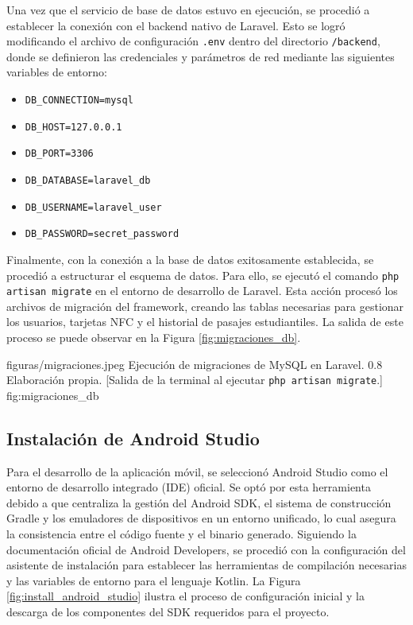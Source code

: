 \documentclass[12pt,letterpaper]{report}
\begin{document}
	Una vez que el servicio de base de datos estuvo en ejecución, se procedió a establecer la conexión con el backend nativo de Laravel. Esto se logró modificando el archivo de configuración \texttt{.env} dentro del directorio \texttt{/backend}, donde se definieron las credenciales y parámetros de red mediante las siguientes variables de entorno:
	
	\begin{itemize}
		\item \texttt{DB\_CONNECTION=mysql}
		\item \texttt{DB\_HOST=127.0.0.1}
		\item \texttt{DB\_PORT=3306}
		\item \texttt{DB\_DATABASE=laravel\_db}
		\item \texttt{DB\_USERNAME=laravel\_user}
		\item \texttt{DB\_PASSWORD=secret\_password}
	\end{itemize}
	
	Finalmente, con la conexión a la base de datos exitosamente establecida, se procedió a estructurar el esquema de datos. Para ello, se ejecutó el comando \texttt{php artisan migrate} en el entorno de desarrollo de Laravel. Esta acción procesó los archivos de migración del framework, creando las tablas necesarias para gestionar los usuarios, tarjetas NFC y el historial de pasajes estudiantiles. La salida de este proceso se puede observar en la Figura \ref{fig:migraciones_db}.
	
	\figuraAPA
	{figuras/migraciones.jpeg}
	{Ejecución de migraciones de MySQL en Laravel.}
	{0.8\textwidth}
	{Elaboración propia.}
	[Salida de la terminal al ejecutar \texttt{php artisan migrate}.]
	{fig:migraciones_db}
	
	
	
	\subsection{Instalación de Android Studio}
	Para el desarrollo de la aplicación móvil, se seleccionó Android Studio como el entorno de desarrollo integrado (IDE) oficial. Se optó por esta herramienta debido a que centraliza la gestión del Android SDK, el sistema de construcción Gradle y los emuladores de dispositivos en un entorno unificado, lo cual asegura la consistencia entre el código fuente y el binario generado. Siguiendo la documentación oficial de Android Developers, se procedió con la configuración del asistente de instalación para establecer las herramientas de compilación necesarias y las variables de entorno para el lenguaje Kotlin. La Figura \ref{fig:install_android_studio} ilustra el proceso de configuración inicial y la descarga de los componentes del SDK requeridos para el proyecto.
	
\end{document}
